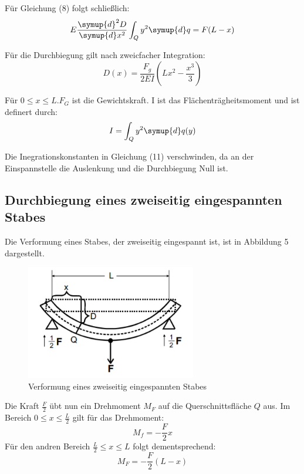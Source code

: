 
Für Gleichung (8) folgt schließlich:
\begin{equation}
  E \frac{\symup{d}^2 D}{\symup{d} x^2} \int_Q y^2 \symup{d}q = F(L - x)
\end{equation}

Für die Durchbiegung gilt nach zweicfacher Integration:
\begin{equation}
  D(x) = \frac{F_g}{2EI} \left(Lx^2 - \frac{x^3}{3} \right)
\end{equation}

Für $0 \leq x \leq L$.$F_G$ ist die Gewichtskraft. I ist das Flächenträgheitsmoment und ist definert durch:
\begin{equation}
  I = \int_Q y^2 \symup{d}q(y)
\end{equation}

Die Inegrationskonstanten in Gleichung (11) verschwinden, da an der Einspannstelle
die Auslenkung und die Durchbiegung Null ist.

\subsection{Durchbiegung eines zweiseitig eingespannten Stabes}
Die Verformung eines Stabes, der zweiseitig eingespannt ist, ist in Abbildung 5
dargestellt.

\begin{figure}[H]
  \centering
  \includegraphics[height=5cm]{zweiseitig.PNG}
  \caption{Verformung eines zweiseitig eingespannten Stabes}
  \label{fig:zweiseitig}
\end{figure}

Die Kraft $\frac{F}{2}$ übt nun ein Drehmoment $M_F$ auf die Querschnittsfläche $Q$ aus.
Im Bereich $0 \leq x \leq \frac{L}{2}$ gilt für das Drehmoment:
\begin{equation}
  M_f = -\frac{F}{2}x
\end{equation}
Für den andren Bereich $\frac{L}{2} \leq x \leq L$ folgt dementsprechend:
\begin{equation}
  M_F = -\frac{F}{2}(L - x)
\end{equation}

